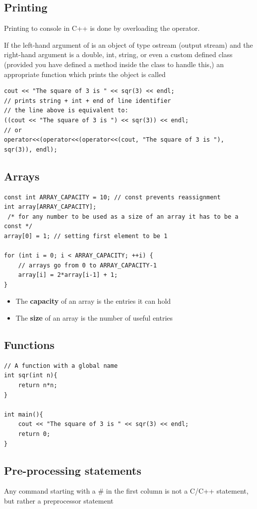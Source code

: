 \documentclass[11pt]{article}
\theoremstyle{definition}
\begin{document}
\subsection{Printing}
Printing to console in C++ is done by overloading the \codeword{<<} operator.

If the left-hand argument of \codeword{<<} is an object of type \codeword{<<} ostream (output stream) and the right-hand argument is a double, int, string, or even a custom defined class (provided you have defined a method inside the class to handle this,) an appropriate function which prints the object is called
\begin{lstlisting}
cout << "The square of 3 is " << sqr(3) << endl;
// prints string + int + end of line identifier
// the line above is equivalent to:
((cout << "The square of 3 is ") << sqr(3)) << endl;
// or
operator<<(operator<<(operator<<(cout, "The square of 3 is "), sqr(3)), endl);
\end{lstlisting}
\subsection{Arrays}
\begin{lstlisting}
const int ARRAY_CAPACITY = 10; // const prevents reassignment
int array[ARRAY_CAPACITY]; 
 /* for any number to be used as a size of an array it has to be a const */
array[0] = 1; // setting first element to be 1

for (int i = 0; i < ARRAY_CAPACITY; ++i) {
    // arrays go from 0 to ARRAY_CAPACITY-1
    array[i] = 2*array[i-1] + 1;
}
\end{lstlisting}
\begin{itemize}[label={--},nolistsep]
    \item The \textbf{capacity} of an array is the entries it can hold
    \item The \textbf{size} of an array is the number of useful entries 
\end{itemize}
\subsection{Functions}
\begin{lstlisting}
// A function with a global name
int sqr(int n){
    return n*n;
}

int main(){
    cout << "The square of 3 is " << sqr(3) << endl;
    return 0;
}
\end{lstlisting}
\newpage
\subsection{Pre-processing statements}
Any command starting with a \# in the first column is not a C/C++ statement, but rather a preprocessor statement
\end{document}
